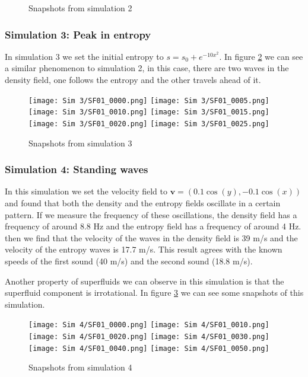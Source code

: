 \documentclass{article}
\begin{document}
\begin{figure}[h]
    \caption{Snapshots from simulation 2}
    \label{sim2}
\end{figure}

\subsubsection{Simulation 3: Peak in entropy}
In simulation 3 we set the initial entropy to \(s = s_0 + e^{-10x^2}\).
In figure \ref{sim3} we can see a similar phenomenon to simulation 2, in this case, there are two waves in the density field, one follows the entropy and the other travels ahead of it.

\begin{figure}[h]
    \texttt{[image: Sim 3/SF01\_0000.png]}
    \texttt{[image: Sim 3/SF01\_0005.png]}
    \texttt{[image: Sim 3/SF01\_0010.png]}
    \texttt{[image: Sim 3/SF01\_0015.png]}
    \texttt{[image: Sim 3/SF01\_0020.png]}
    \texttt{[image: Sim 3/SF01\_0025.png]}
    \caption{Snapshots from simulation 3}
    \label{sim3}
\end{figure}

\subsubsection{Simulation 4: Standing waves}
In this simulation we set the velocity field to \(\mathbf{v} = (0.1\cos(y), -0.1\cos(x))\) and found that both the density and the entropy fields oscillate in a certain pattern. If we measure the frequency of these oscillations, the density field has a frequency of around 8.8 Hz and the entropy field has a frequency of around 4 Hz.  then we find that the velocity of the waves in the density field is 39 m/s and the velocity of the entropy waves is 17.7 m/s. This result agrees with the known speeds of the first sound (40 m/s) and the second sound (18.8 m/s).

Another property of superfluids we can observe in this simulation is that the superfluid component is irrotational. In figure \ref{sim4} we can see some snapshots of this simulation.

\begin{figure}[h]
    \texttt{[image: Sim 4/SF01\_0000.png]}
    \texttt{[image: Sim 4/SF01\_0010.png]}
    \texttt{[image: Sim 4/SF01\_0020.png]}
    \texttt{[image: Sim 4/SF01\_0030.png]}
    \texttt{[image: Sim 4/SF01\_0040.png]}
    \texttt{[image: Sim 4/SF01\_0050.png]}
    \caption{Snapshots from simulation 4}
    \label{sim4}
\end{figure}
\end{document}
